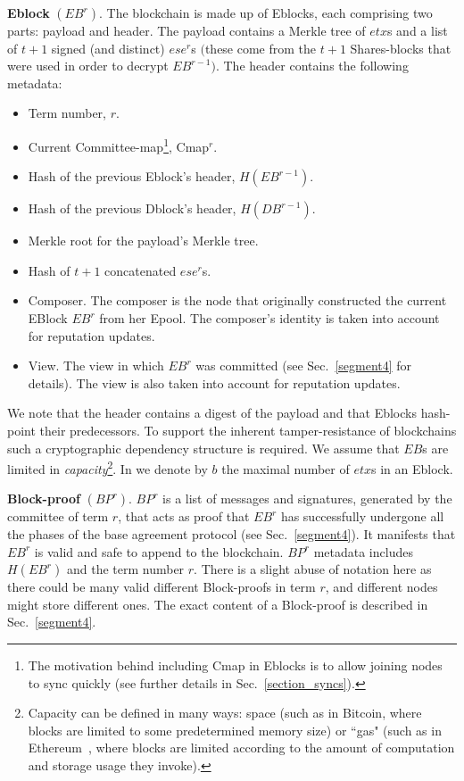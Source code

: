 \textbf{Eblock} $(EB^r)$. 
The \name blockchain is made up of Eblocks, each comprising two parts: payload and header. The payload contains a Merkle tree of $etx$s and a list of $t+1$ signed (and distinct) $ese^r$s $\big($these come from the $t+1$ Shares-blocks that were used in order to decrypt $EB^{r-1} \big)$. 
The header contains the following metadata: 
\begin{itemize}
\item Term number, $r$.
\item Current Committee-map\footnote{The motivation behind including Cmap in Eblocks is to allow joining nodes to sync quickly (see further details in Sec.~\ref{section_syncs}).}, Cmap$^r$.
\item Hash of the previous Eblock's header, $H(EB^{r-1})$. 
\item Hash of the previous Dblock's header, $H(DB^{r-1})$.
\item Merkle root for the payload's Merkle tree.
\item Hash of $t+1$ concatenated $ese^r$s.
\item Composer. The composer is the node that originally constructed the current EBlock $EB^r$ from her Epool. The composer's identity is taken into account for reputation updates.
\item View. The view in which $EB^r$ was committed (see Sec.~\ref{segment4} for details). The view is also taken into account for reputation updates.
\end{itemize}
We note that the header contains a digest of the payload and that Eblocks hash-point their predecessors. To support the inherent tamper-resistance of blockchains such a cryptographic dependency structure is required.
We assume that $EB$s are limited in \emph{capacity}\footnote{Capacity can be defined in many ways: space (such as in Bitcoin, where blocks are limited to some predetermined memory size) or ``gas" (such as in Ethereum~\cite{Ethereum}, where blocks are limited according to the amount of computation and storage usage they invoke).}. In \name we denote by $b$ the maximal number of $etx$s in an Eblock.
 

\textbf{Block-proof} $(BP^r)$.
$BP^r$ is a list of messages and signatures, generated by the committee of term $r$, that acts as proof that $EB^r$ has successfully undergone all the phases of the \name base agreement protocol (see Sec.~\ref{segment4}). It manifests that $EB^r$ is valid and safe to append to the blockchain. $BP^r$ metadata includes $H(EB^{r})$ and the term number $r$. There is a slight abuse of notation here as there could be many valid different Block-proofs in term $r$, and different nodes might store different ones. The exact content of a Block-proof is described in Sec.~\ref{segment4}.

